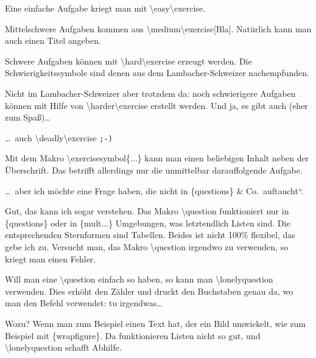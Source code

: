 \documentclass[hyperworksheet]{drcschool}
\makeatletter
\newcommand*{\bcode}{%
   \vskip.5ex\begingroup                                                   %
   \parindent\z@\advance\leftskip4em\ttfamily                              %
   \def\\{\textbackslash}\def\nl{\newline}%
}                                                                          %
\newcommand*{\ecode}{\par\endgroup\vskip.5ex\@doendpe}                     %
\newcommand*{\cs}[1]{\textup{\ttfamily\textbackslash#1}}                   %
\newcommand*{\env}[1]{\textup{\ttfamily\{#1\}}}                            %
\newcommand*{\param}[1]{\mbox{\normalfont$\langle$\textit{#1}$\rangle$}}   %
\makeatother
\begin{document}
\begin{worksheet}

\easy\exercise
Eine einfache Aufgabe kriegt man mit \cs{easy}\cs{exercise}.

\medium\exercise[Bla]
Mittelschwere Aufgaben kommen aus \cs{medium}\cs{exercise[Bla]}. Natürlich kann man auch
einen Titel angeben.

\hard\exercise
Schwere Aufgaben können mit \cs{hard}\cs{exercise} erzeugt werden.
Die Schwierigkeitssymbole sind denen aus dem Lambacher-Schweizer
nachempfunden.

\harder{}
Nicht im Lambacher-Schweizer aber trotzdem da: noch schwierigere Aufgaben
können mit Hilfe von \cs{harder}\cs{exercise} erstellt werden. Und ja, es
gibt auch (eher zum Spaß)\ldots

\deadly\exercise
\ldots\ auch \cs{deadly}\cs{exercise} \texttt{;-)}

\exercisesymbol{$\heartsuit\varheartsuit\heartsuit$}
Mit dem Makro \cs{exercisesymbol\{...\}} kann man einen beliebigen Inhalt neben
der Überschrift. Das betrifft allerdings nur die unmittelbar darauf{}folgende Aufgabe.

\ldots\ aber ich möchte eine Frage haben, die nicht in \env{questions} \& Co.\ auftaucht``.

Gut, das kann ich sogar verstehen. Das Makro \cs{question} funktioniert nur in
\env{questions} oder in \env{mult...} Umgebungen, was letztendlich Listen sind.
Die entsprechenden Sternformen sind Tabellen. Beides ist nicht 100\% flexibel,
das gebe ich zu. Versucht man, das Makro \cs{question} irgendwo zu verwenden,
so kriegt man einen Fehler.

Will man eine \cs{question} einfach so haben, so kann man \cs{lonelyquestion}
verwenden. Dies erhöht den Zähler und druckt den Buchstaben genau da, wo
man den Befehl verwendet: \lonelyquestion tu irgendwas\ldots

\begin{solution}
\answer Wozu? Wenn man zum Beispiel einen Text hat, der ein Bild umwickelt,
wie zum Beispiel mit \env{wrapfigure}. Da funktionieren Listen nicht so gut,
und \cs{lonelyquestion} schafft Abhilfe.
\end{solution}
\end{worksheet}
\end{document}
